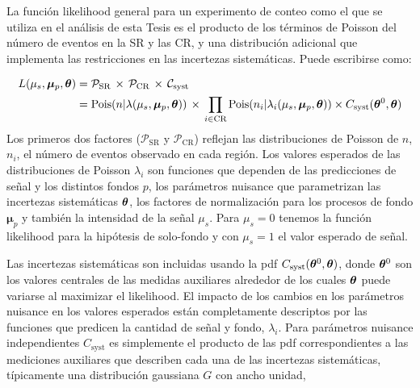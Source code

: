 

La función likelihood general para un experimento de conteo como el que se utiliza
en el análisis de esta Tesis es el producto de los términos de Poisson del
número de eventos en la SR y las CR, y una distribución adicional que implementa
las restricciones en las incertezas sistemáticas. Puede escribirse como:

\begin{align}
  L(\mu_s, \bm{\mu}_p, \bm{\theta}) &= \mathcal{P}_\text{SR} \, \times \, \mathcal{P}_\text{CR} \, \times \,
  \mathcal{C}_\text{syst} \nonumber \\
  &= \operatorname{Pois}(n|\lambda(\mu_s, \bm{\mu}_p, \bm{\theta})) \, \times \, \prod_{i \in \text{CR}}
  \operatorname{Pois}(n_i|\lambda_i(\mu_s, \bm{\mu}_p, \bm{\theta})) \times C_\text{syst} (\bm{\theta}^0, \bm{\theta}) \label{eq:model}
\end{align}
%
Los primeros dos factores ($\mathcal{P}_\text{SR}$ y $\mathcal{P}_\text{CR}$)
reflejan las distribuciones de Poisson de $n$, $n_i$, el número de eventos observado
en cada región. Los valores esperados de las distribuciones de Poisson $\lambda_i$ son
funciones que dependen de las predicciones de señal y los distintos fondos $p$,
los parámetros nuisance que parametrizan las incertezas sistemáticas $\bm{\theta}$,
los factores de normalización para los procesos de fondo $\bm{\mu}_p$ y también
la intensidad de la señal $\mu_s$. Para $\mu_s = 0$ tenemos la
función likelihood para la hipótesis de solo-fondo y con $\mu_s = 1$ el
valor esperado de señal. %

Las incertezas sistemáticas son incluidas usando la pdf
$C_\text{syst}(\bm{\theta}^0, \bm{\theta})$, donde $\bm{\theta}^0$ son los valores centrales
de las medidas auxiliares alrededor de los cuales $\bm{\theta}$ puede variarse al
maximizar el likelihood. El impacto de los cambios en los parámetros nuisance
en los valores esperados están completamente descriptos por las funciones que
predicen la cantidad de señal y fondo, $\lambda_i$. Para parámetros nuisance
independientes $C_\text{syst}$ es simplemente el producto de las pdf
correspondientes a las mediciones auxiliares que describen cada una de las
incertezas sistemáticas, típicamente una distribución gaussiana $G$ con ancho
unidad,

